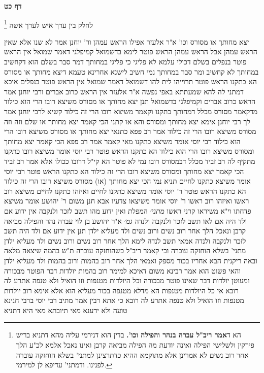 \documentclass[12pt, openany]{book}
\newcommand{\sethebfont}{
\fontsize{10.5pt}{21.0pt} \selectfont
}
\newcommand{\twocol}[1]{
	{\sethebfont \begin{multicols}{2}
			#1
	\end{multicols}}	
}
\newcommand{\sectname}{}
\newcommand{\newsection}[1]{
	\addcontentsline{toc}{section}{#1}
	\renewcommand{\sectname}{#1}	
	\vspace{-\baselineskip}
	\begin{center}
		\textbf{%
\fontsize{16pt}{16pt}\selectfont
			#1}
	\end{center}
	\vspace{-\baselineskip}
	\nopagebreak
}
\newcommand{\footnotecomment}[1]{\footnote{#1}}
\newcommand{\commenta}[1]{\footnotecomment{#1}}
\begin{document}
\newsection{דף כט}
\twocol{לחלק בין ערך איש לערך אשה
\commenta{ הא ד\textbf{אמר ריב"ל עברה בנהר והפילה וכו'.}  בדין הוא דנירמי עליה מהא דתניא בריש פירקין ולשלישי הפילה ואינה יודעת מה הפילה מביאה קרבן ואינו נאכל אלמא לכ"ע הלך אחר רוב נשים לא אמרינן אלא מתוקמא ההיא כדתרצינן למתני' בשלא הוחזקה עוברה לפנינו. ודמתני' עדיפא לן למירמי. }

יצא מחותך או מסורס וכו' א"ר אלעזר  אפילו הראש עמהן 
ור' יוחנן אמר  לא שנו אלא שאין הראש עמהן אבל הראש עמהן הראש פוטר 
לימא בדשמואל קמיפלגי דאמר שמואל  אין הראש פוטר בנפלים 
בשלם דכולי עלמא לא פליגי כי פליגי במחותך  דמר סבר  בשלם הוא דקחשיב במחותך לא קחשיב  ומר סבר  במחותך נמי חשיב 
לישנא אחרינא  טעמא דיצא מחותך או מסורס הא כתקנו הראש פוטר תרוייהו לית להו דשמואל דאמר  שמואל אין הראש פוטר בנפלים 
איכא דמתני לה להא שמעתתא באפי נפשה א"ר אלעזר  אין הראש כרוב אברים ורבי יוחנן אמר  הראש כרוב אברים  וקמיפלגי בדשמואל 
תנן  יצא מחותך או מסורס משיצא רובו הרי הוא כילוד  מדקאמר מסורס מכלל דמחותך כתקנו וקאמר משיצא רובו הרי זה כילוד  קשיא לרבי יוחנן 
אמר לך רבי יוחנן  אימא יצא מחותך ומסורס 
והא או קתני  הכי קאמר  יצא מחותך או שלם וזה וזה מסורס משיצא רובו הרי זה כילוד 
אמר רב פפא  כתנאי  יצא מחותך או מסורס משיצא רובו הרי הוא כילוד רבי יוסי אומר  משיצא כתקנו  מאי קאמר 
אמר רב פפא הכי קאמר  יצא מחותך ומסורס משיצא רובו הרי הוא כילוד הא כתקנו הראש פוטר  רבי יוסי אומר משיצא רובו כתקנו 
מתקיף לה רב זביד  מכלל דבמסורס רובו נמי לא פוטר הא קי"ל דרובו ככולו 
אלא אמר רב זביד הכי קאמר  יצא מחותך ומסורס משיצא רובו הרי זה כילוד הא כתקנו הראש פוטר  רבי יוסי אומר  משיצא כתקנו לחיים 
תניא נמי הכי  יצא מחותך (או) מסורס משיצא רובו הרי זה כילוד הא כתקנו הראש פוטר  ר' יוסי אומר  משיצא כתקנו לחיים 
ואיזהו כתקנו לחיים משיצא רוב ראשו  ואיזהו רוב ראשו  ר' יוסי אומר  משיצאו צדעיו אבא חנן משום ר' יהושע אומר  משיצא פדחתו וי"א  משיראו קרני ראשו
{\large\emph{מתני׳}} המפלת ואין ידוע מהו תשב לזכר ולנקבה אין ידוע אם ולד היה אם לאו תשב לזכר ולנקבה ולנדה
{\large\emph{גמ׳}} א"ר יהושע בן לוי עברה נהר והפילה מביאה קרבן ונאכל הלך אחר רוב נשים ורוב נשים ולד מעליא ילדן 
תנן  אין ידוע אם ולד היה תשב לזכר ולנקבה ולנדה  אמאי תשב לנדה  לימא  הלך אחר רוב נשים ורוב נשים ולד מעליא ילדן 
מתני' בשלא הוחזקה עוברה וכי קאמר ריב"ל כשהוחזקה עוברה 
ת"ש  בהמה שיצאה מלאה ובאה ריקנית הבא אחריו בכור מספק 
ואמאי  הלך אחר רוב בהמות ורוב בהמות ולד מעליא ילדן והאי פשוט הוא 
אמר רבינא  משום דאיכא למימר רוב בהמות יולדות דבר הפוטר מבכורה ומעוטן יולדות דבר שאינו פוטר מבכורה וכל היולדות מטנפות וזו הואיל ולא טנפה אתרע לה רובא 
אי כל היולדות מטנפות הא מדלא מטנפה בכור מעליא הוא  אלא אימא  רוב יולדות מטנפות וזו הואיל ולא טנפה אתרע לה רובא 
כי אתא רבין אמר  מתיב רבי יוסי ברבי חנינא טועה ולא ידענא מאי תיובתא  מאי היא  דתניא
}
\end{document}
